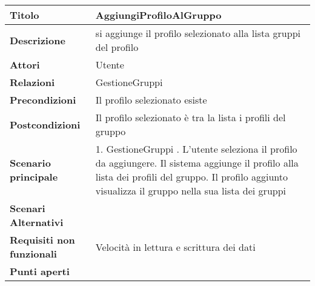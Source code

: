 \begin{tabular} {|P{4.5cm}|P{11cm}|}
  \hline
  \textbf{Titolo}                   & AggiungiProfiloAlGruppo                                          \\
  \hline
  \textbf{Descrizione}              & si aggiunge il profilo selezionato alla lista gruppi del profilo \\
  \hline
  \textbf{Attori}                   & Utente                                                           \\
  \hline
  \textbf{Relazioni}                & GestioneGruppi                                                   \\
  \hline
  \textbf{Precondizioni}            & Il profilo selezionato esiste                                    \\
  \hline
  \textbf{Postcondizioni}           & Il profilo selezionato è tra la lista i profili del gruppo       \\
  \hline
  \textbf{Scenario principale}      & 1. GestioneGruppi . L'utente seleziona il profilo da aggiungere. Il sistema aggiunge il profilo alla lista dei profili del gruppo. Il profilo aggiunto visualizza il gruppo nella sua lista dei gruppi                               \\
  \hline
  \textbf{Scenari Alternativi}      &                                                                  \\
  \hline
  \textbf{Requisiti non funzionali} & Velocità in lettura e scrittura dei dati                         \\
  \hline
  \textbf{Punti aperti}             &                                                                  \\
  \hline
\end{tabular}
\hfill
\break

